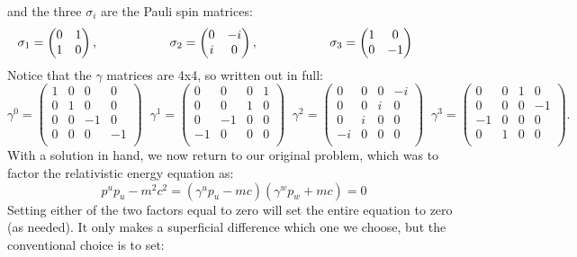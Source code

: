 \documentclass[12pt]{book}
\begin{document}
and the three $\sigma_i$ are the Pauli spin matrices:
$$\sigma_1 = \begin{pmatrix} 0 & 1 \\ 1 & 0 \end{pmatrix}, \hspace{2cm}
\sigma_2 = \begin{pmatrix} 0 & -i \\ i & 0 \end{pmatrix}, \hspace{2cm}
\sigma_3 = \begin{pmatrix} 1 & 0 \\ 0 & -1 \end{pmatrix}\\
\hspace{1cm} 
$$
Notice that the $\gamma$ matrices are 4x4, so written out in full:
$$\gamma^0 = \begin{pmatrix} 
1 & 0 & 0 & 0 \\ 
0 & 1 & 0 & 0 \\ 
0 & 0 &-1 & 0 \\ 
0 & 0 & 0 &-1 \\ 
\end{pmatrix} \;\;
\gamma^1 = \begin{pmatrix} 
0 & 0 & 0 & 1 \\ 
0 & 0 & 1 & 0 \\ 
0 &-1 & 0 & 0 \\ 
-1& 0 & 0 & 0 \\ 
\end{pmatrix} \;\;
\gamma^2 = \begin{pmatrix} 
 0 & 0 & 0 &-i \\ 
 0 & 0 & i & 0 \\ 
 0 & i & 0 & 0 \\ 
-i & 0 & 0 & 0 \\ 
\end{pmatrix} \;\;
\gamma^3 = \begin{pmatrix} 
0 & 0 & 1 & 0 \\ 
0 & 0 & 0 &-1 \\ 
-1& 0 & 0 & 0 \\ 
0 & 1 & 0 & 0 \\ 
\end{pmatrix}.
$$
With a solution in hand, we now return to our original problem, which was to factor the relativistic energy equation as:
$$p^up_u-m^2c^2 = \left( \gamma^u p_u - mc \right) \left( \gamma^w p_w + mc \right) = 0$$
Setting either of the two factors equal to zero will set the entire equation to zero (as needed).  It only makes a superficial difference which one we choose, but the conventional choice is to set:
\end{document}
